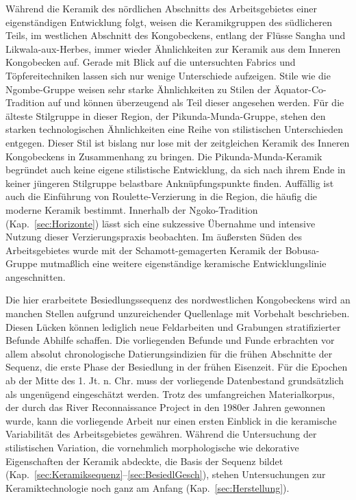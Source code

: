 \begin{multicols}{2}
Während die Keramik des nördlichen Abschnitts des Arbeitsgebietes einer eigenständigen Entwicklung folgt, weisen die Keramikgruppen des südlicheren Teils, im westlichen Abschnitt des Kongobeckens, entlang der Flüsse Sangha und Likwala-aux-Herbes, immer wieder Ähnlichkeiten zur Keramik aus dem Inneren Kongobecken auf. Gerade mit Blick auf die untersuchten Fabrics und Töpfereitechniken lassen sich nur wenige Unterschiede aufzeigen. Stile wie die Ngombe-Gruppe weisen sehr starke Ähnlichkeiten zu Stilen der Äquator-Co-Tradition auf und können überzeugend als Teil dieser angesehen werden. Für die älteste Stilgruppe in dieser Region, der Pikunda-Munda-Gruppe, stehen den starken technologischen Ähnlichkeiten eine Reihe von stilistischen Unterschieden entgegen. Dieser Stil ist bislang nur lose mit der zeitgleichen Keramik des Inneren Kongobeckens in Zusammenhang zu bringen. Die Pikunda-Munda-Keramik begründet auch keine eigene stilistische Entwicklung, da sich nach ihrem Ende in keiner jüngeren Stilgruppe belastbare Anknüpfungspunkte finden. Auffällig ist auch die Einführung von Roulette-Verzierung in die Region, die häufig die moderne Keramik bestimmt. Innerhalb der Ngoko-Tradition (Kap.~\ref{sec:Horizonte}) lässt sich eine sukzessive Übernahme und intensive Nutzung dieser Verzierungspraxis beobachten. Im äußersten Süden des Arbeitsgebietes wurde mit der Schamott-gemagerten Keramik der Bobusa-Gruppe mutmaßlich eine weitere eigenständige keramische Entwicklungslinie angeschnitten.

Die hier erarbeitete Besiedlungssequenz des nordwestlichen Kongobeckens wird an manchen Stellen aufgrund unzureichender Quellenlage mit Vorbehalt beschrieben. Diesen Lücken können lediglich neue Feldarbeiten und Grabungen stratifizierter Befunde Abhilfe schaffen. Die vorliegenden Befunde und Funde erbrachten vor allem absolut chronologische Datierungsindizien für die frühen Abschnitte der Sequenz, die erste Phase der Besiedlung in der frühen Eisenzeit.  Für die Epochen ab der Mitte des 1. Jt. n. Chr. muss der vorliegende Datenbestand grundsätzlich als ungenügend eingeschätzt werden. Trotz des umfangreichen Materialkorpus, der durch das River Reconnaissance Project in den 1980er Jahren gewonnen wurde, kann die vorliegende Arbeit nur einen ersten Einblick in die keramische Variabilität des Arbeitsgebietes gewähren. Während die Untersuchung der stilistischen Variation, die vornehmlich morphologische wie dekorative Eigenschaften der Keramik abdeckte, die Basis der Sequenz bildet (Kap.~\ref{sec:Keramiksequenz}--\ref{sec:BesiedlGesch}), stehen Untersuchungen zur Keramiktechnologie noch ganz am Anfang (Kap.~\ref{sec:Herstellung}).
\end{multicols}

